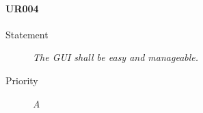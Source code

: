 \paragraph{UR004}
  \begin{description}
  \item [Statement] 
    \textit{ The GUI shall be easy and manageable.}
  \item [Priority] \textit{A}
\end{description}